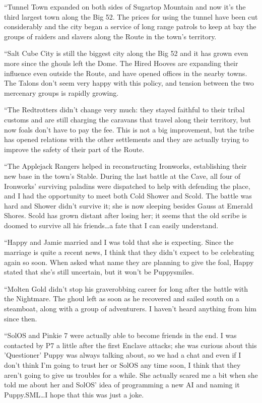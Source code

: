 {``Tunnel Town expanded on both sides of Sugartop Mountain and now it's the third largest town along the Big 52. The prices for using the tunnel have been cut considerably and the city began a service of long range patrols to keep at bay the groups of raiders and slavers along the Route in the town's territory.

``Salt Cube City is still the biggest city along the Big 52 and it has grown even more since the ghouls left the Dome. The Hired Hooves are expanding their influence even outside the Route, and have opened offices in the nearby towns. The Talons don't seem very happy with this policy, and tension between the two mercenary groups is rapidly growing.

``The Redtrotters didn't change very much: they stayed faithful to their tribal customs and are still charging the caravans that travel along their territory, but now foals don't have to pay the fee. This is not a big improvement, but the tribe has opened relations with the other settlements and they are actually trying to improve the safety of their part of the Route.

``The Applejack Rangers helped in reconstructing Ironworks, establishing their new base in the town's Stable. During the last battle at the Cave, all four of Ironworks' surviving paladins were dispatched to help with defending the place, and I had the opportunity to meet both Cold Shower and Scold. The battle was hard and Shower didn't survive it; she is now sleeping besides Gauss at Emerald Shores. Scold has grown distant after losing her; it seems that the old scribe is doomed to survive all his friends\dots a fate that I can easily understand.

``Happy and Jamie married and I was told that she is expecting. Since the marriage is quite a recent news, I think that they didn't expect to be celebrating again so soon. When asked what name they are planning to give the foal, Happy stated that she's still uncertain, but it won't be Puppysmiles.

``Molten Gold didn't stop his graverobbing career for long after the battle with the Nightmare. The ghoul left as soon as he recovered and sailed south on a steamboat, along with a group of adventurers. I haven't heard anything from him since then.

``SolOS and Pinkie 7 were actually able to become friends in the end. I was contacted by P7 a little after the first Enclave attacks; she was curious about this 'Questioner' Puppy was always talking about, so we had a chat and even if I don't think I'm going to trust her or SolOS any time soon, I think that they aren't going to give us troubles for a while. She actually scared me a bit when she told me about her and SolOS' idea of programming a new AI and naming it Puppy.SML\dots I hope that this was just a joke.

}
